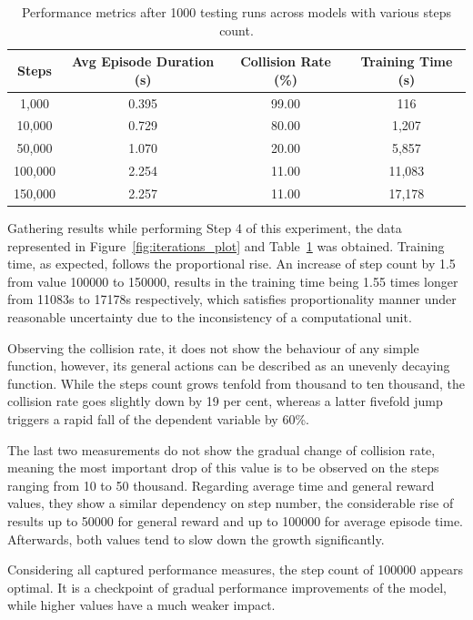 \begin{table}[ht]
    \centering
    \renewcommand{\arraystretch}{1.4}
    \setlength{\tabcolsep}{12pt}
    \begin{tabular}{cccc}
    \hline
    \textbf{Steps} & \textbf{Avg Episode Duration (s)} & \textbf{Collision Rate (\%)} & \textbf{Training Time (s)} \\ \hline
    1,000    & 0.395 & 99.00 & 116    \\ \hline
    10,000   & 0.729 & 80.00 & 1,207  \\ \hline
    50,000   & 1.070 & 20.00 & 5,857  \\ \hline
    100,000  & 2.254 & 11.00 & 11,083 \\ \hline
    150,000  & 2.257 & 11.00 & 17,178 \\ \hline
    \end{tabular}
    \caption{Performance metrics after 1000 testing runs across models with various steps count.}
    \label{tab:performance_metrics}
\end{table}

Gathering results while performing Step 4 of this experiment, the data represented in Figure~\ref{fig:iterations_plot} and Table~\ref{tab:performance_metrics} was obtained. Training time, as expected, follows the proportional rise. An increase of step count by 1.5 from value 100000 to 150000, results in the training time being 1.55 times longer from 11083s to 17178s respectively, which satisfies proportionality manner under reasonable uncertainty due to the inconsistency of a computational unit. 

Observing the collision rate, it does not show the behaviour of any simple function, however, its general actions can be described as an unevenly decaying function. While the steps count grows tenfold from thousand to ten thousand, the collision rate goes slightly down by 19 per cent, whereas a latter fivefold jump triggers a rapid fall of the dependent variable by 60\%. 

The last two measurements do not show the gradual change of collision rate, meaning the most important drop of this value is to be observed on the steps ranging from 10 to 50 thousand. Regarding average time and general reward values, they show a similar dependency on step number, the considerable rise of results up to 50000 for general reward and up to 100000 for average episode time. Afterwards, both values tend to slow down the growth significantly. 

Considering all captured performance measures, the step count of 100000 appears optimal. It is a checkpoint of gradual performance improvements of the model, while higher values have a much weaker impact.


